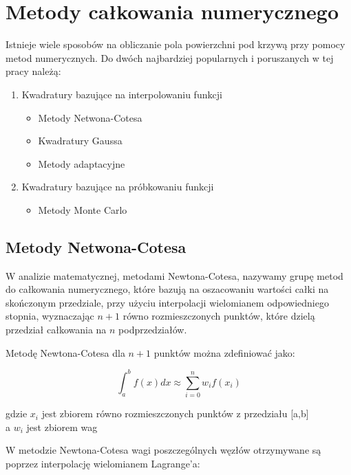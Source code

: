 \documentclass[12pt,twoside]{article}
\begin{document}
\clearpage

\section{Metody całkowania numerycznego}

Istnieje wiele sposobów na obliczanie pola powierzchni pod krzywą przy pomocy metod numerycznych. Do dwóch najbardziej popularnych i poruszanych w tej pracy należą:

\begin{enumerate}
	\item Kwadratury bazujące na interpolowaniu funkcji
	\begin{itemize}
		\item Metody Netwona-Cotesa
		\item Kwadratury Gaussa
		\item Metody adaptacyjne
	\end{itemize}
	\item Kwadratury bazujące na próbkowaniu funkcji
	\begin{itemize}
		\item Metody Monte Carlo
	\end{itemize}
\end{enumerate}

\subsection{Metody Netwona-Cotesa}

W analizie matematycznej, metodami Newtona-Cotesa, nazywamy grupę metod do całkowania numerycznego, które bazują na oszacowaniu wartości całki na skończonym przedziale, przy użyciu interpolacji wielomianem odpowiedniego stopnia, wyznaczając $n+1$ równo rozmieszczonych punktów, które dzielą przedział całkowania na $n$ podprzedziałów.
\cite{wikipedia}

Metodę Newtona-Cotesa dla $n+1$ punktów  można zdefiniować jako:

\begin{equation}
\int_a^b f(x)dx \approx \sum_{i=0}^n w_i f(x_i)
\label{Eq:rownanie}
\end{equation}


gdzie 
$x_i$ jest zbiorem równo rozmieszczonych punktów z przedziału [a,b]\\
a $w_i$ jest zbiorem wag


W metodzie Newtona-Cotesa wagi poszczególnych węzłów otrzymywane są poprzez interpolację wielomianem Lagrange'a:
\end{document}
